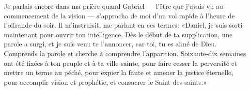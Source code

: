 Je parlais encore dans ma prière quand Gabriel
	--- l’être que j’avais vu au commencement de la vision ---
	s’approcha de moi d’un vol rapide à l’heure de l’offrande du soir.
Il m’instruisit, me parlant en ces termes:
	«Daniel, je suis sorti maintenant pour ouvrir ton intelligence.
Dès le début de ta supplication, une parole a surgi, et je suis venu te l’annoncer,
	car toi, tu es aimé de Dieu.
Comprends la parole et cherche à comprendre l’apparition.
Soixante-dix semaines ont été fixées à ton peuple et à ta ville sainte,
	pour faire cesser la perversité et mettre un terme au péché,
	pour expier la faute et amener la justice éternelle,
	pour accomplir vision et prophétie, et consacrer le Saint des saints.»
